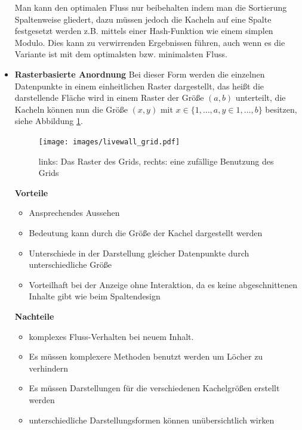 \documentclass[12pt,twoside]{book}
\begin{document}
\begin{itemize}
Man kann den optimalen Fluss nur beibehalten indem man die Sortierung Spaltenweise gliedert, dazu müssen jedoch die Kacheln auf eine Spalte festgesetzt werden z.B. mittels einer Hash-Funktion wie einem simplen Modulo. Dies kann zu verwirrenden Ergebnissen führen, auch wenn es die Variante ist mit dem optimalsten bzw. minimalsten Fluss.

  \item \textbf{Rasterbasierte Anordnung}
  Bei dieser Form werden die einzelnen Datenpunkte in einem einheitlichen Raster dargestellt, das heißt die darstellende Fläche wird in einem Raster der Größe $(a, b)$ unterteilt, die Kacheln können nun die Größe $(x, y)$ mit $ x \in \{1, \dots, a, y \in 1, \dots, b\}$ besitzen, siehe Abbildung \ref{fig:raster}.

  \begin{figure}[htbp]
    \centering
    \texttt{[image: images/livewall\_grid.pdf]}
    \caption{links: Das Raster des Grids, rechts: eine zufällige Benutzung des Grids}
    \label{fig:raster}
  \end{figure}

  \textbf{Vorteile} \\
  \begin{itemize}
    \item Ansprechendes Aussehen
    \item Bedeutung kann durch die Größe der Kachel dargestellt werden
    \item Unterschiede in der Darstellung gleicher Datenpunkte durch unterschiedliche Größe
    \item Vorteilhaft bei der Anzeige ohne Interaktion, da es keine abgeschnittenen Inhalte gibt wie beim Spaltendesign
  \end{itemize}

  \textbf{Nachteile}\\
  \begin{itemize}
    \item komplexes Fluss-Verhalten bei neuem Inhalt.
    \item Es müssen komplexere Methoden benutzt werden um Löcher zu verhindern
    \item Es müssen Darstellungen für die verschiedenen Kachelgrößen erstellt werden
    \item unterschiedliche Darstellungsformen können unübersichtlich wirken
  \end{itemize}

\end{itemize}
\end{document}
